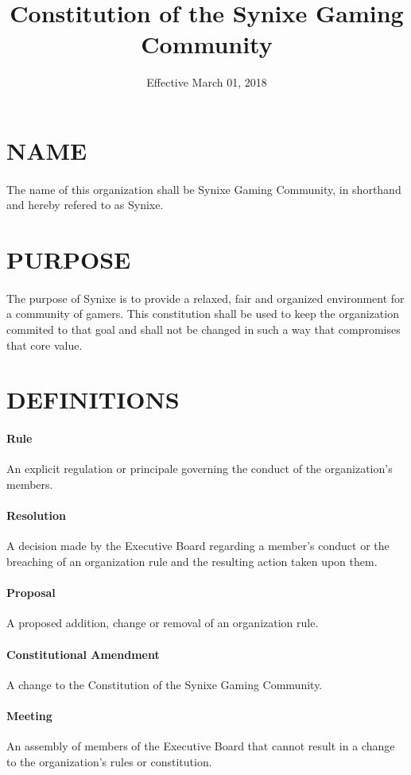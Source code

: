 \documentclass[10pt,a4paper]{article}
\title{Constitution of the Synixe Gaming Community}
\date{Effective March 01, 2018}
\begin{document}
\maketitle
\newpage
\section{NAME}
\paragraph{}
The name of this organization shall be Synixe Gaming Community, in shorthand and hereby refered to as Synixe.
\section{PURPOSE}
\paragraph{}
The purpose of Synixe is to provide a relaxed, fair and organized environment for a community of gamers. This constitution shall be used to keep the organization commited to that goal and shall not be changed in such a way that compromises that core value.
\section{DEFINITIONS}
\paragraph{Rule} An explicit regulation or principale governing the conduct of the organization's members.
\paragraph{Resolution} A decision made by the Executive Board regarding a member's conduct or the breaching of an organization rule and the resulting action taken upon them.
\paragraph{Proposal} A proposed addition, change or removal of an organization rule.
\paragraph{Constitutional Amendment} A change to the Constitution of the Synixe Gaming Community.
\paragraph{Meeting} An assembly of members of the Executive Board that cannot result in a change to the organization's rules or constitution.
\end{document}
